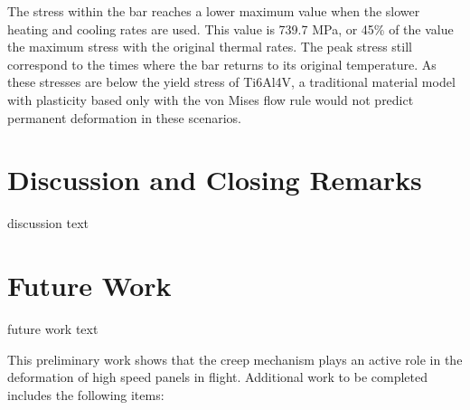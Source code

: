 \documentclass[conf]{new-aiaa}
\begin{document}

The stress within the bar reaches a lower maximum value 
when the slower heating and cooling rates are used.
This value is 739.7 MPa, or 45\% of the value
the maximum stress with the original thermal rates.
The peak stress still correspond to the times where
the bar returns to its original temperature.
As these stresses are below the yield stress of Ti6Al4V, 
a traditional material model with plasticity based only with the
von Mises flow rule would not predict permanent deformation 
in these scenarios.




\section{Discussion and Closing Remarks} \label{sec_closing_remarks}
discussion text

\section{Future Work} \label{sec_future}
future work text

This preliminary work shows that the creep mechanism plays 
an active role in the deformation of high speed panels in flight.
Additional work to be completed includes the following items:
\end{document}
